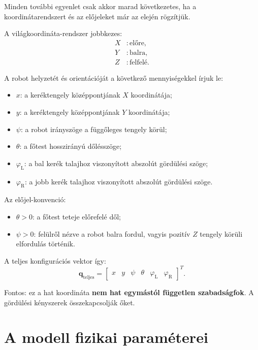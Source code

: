 \documentclass[12pt,a4paper]{article}
\newcommand{\phiL}{\varphi_{\mathrm{L}}}
\newcommand{\phiR}{\varphi_{\mathrm{R}}}
\begin{document}
	Minden további egyenlet csak akkor marad következetes, ha a koordinátarendszert és az előjeleket már az elején rögzítjük.
	
	A világkoordináta-rendszer jobbkezes:
	\begin{align*}
		X &: \text{előre},\\
		Y &: \text{balra},\\
		Z &: \text{felfelé}.
	\end{align*}
	
	A robot helyzetét és orientációját a következő mennyiségekkel írjuk le:
	\begin{itemize}[leftmargin=2em]
		\item $x$: a keréktengely középpontjának $X$ koordinátája;
		\item $y$: a keréktengely középpontjának $Y$ koordinátája;
		\item $\psi$: a robot irányszöge a függőleges tengely körül;
		\item $\theta$: a főtest hosszirányú dőlésszöge;
		\item $\phiL$: a bal kerék talajhoz viszonyított abszolút gördülési szöge;
		\item $\phiR$: a jobb kerék talajhoz viszonyított abszolút gördülési szöge.
	\end{itemize}
	
	Az előjel-konvenció:
	\begin{itemize}[leftmargin=2em]
		\item $\theta>0$: a főtest teteje előrefelé dől;
		\item $\psi>0$: felülről nézve a robot balra fordul, vagyis pozitív $Z$ tengely körüli elfordulás történik.
	\end{itemize}
	
	A teljes konfigurációs vektor így:
	\begin{equation}
		\bm q_{\mathrm{teljes}}=
		\begin{bmatrix}
			x & y & \psi & \theta & \phiL & \phiR
		\end{bmatrix}^{\!T}.
	\end{equation}
	
	Fontos: ez a hat koordináta \textbf{nem hat egymástól független szabadságfok}. A gördülési kényszerek összekapcsolják őket.
	
	\section{A modell fizikai paraméterei}
	
\end{document}
